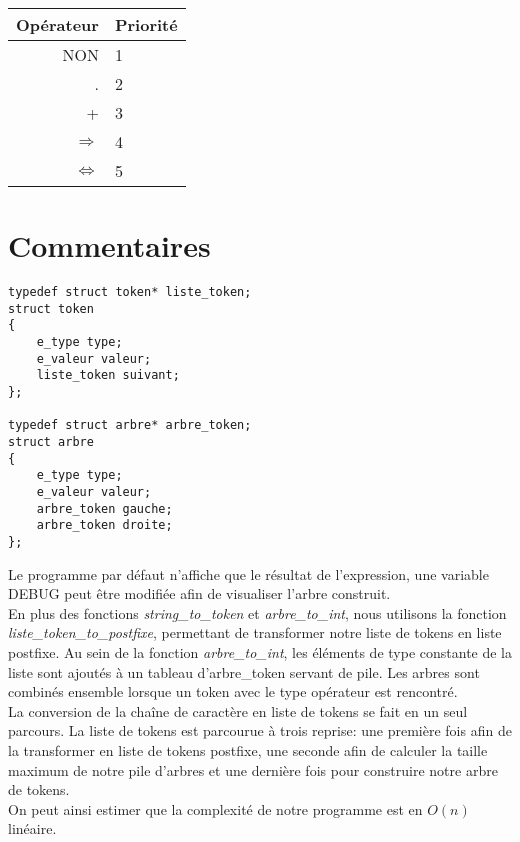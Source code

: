\documentclass{article}
\begin{document}
\begin{tabular}[h]{|r|l|}
\hline 
    Opérateur & Priorité\\ 
\hline 
    NON & 1\\
\hline 
    . & 2\\
\hline 
    + & 3\\
\hline 
    $\Rightarrow$ & 4\\
\hline 
    $\Leftrightarrow$ & 5\\
\hline
\end{tabular}
\section{Commentaires}
\begin{verbatim}
typedef struct token* liste_token;
struct token
{
	e_type type;
	e_valeur valeur;
	liste_token suivant;
};

typedef struct arbre* arbre_token;
struct arbre
{
	e_type type;
	e_valeur valeur;
	arbre_token gauche;
	arbre_token droite;
};
\end{verbatim}
Le programme par défaut n'affiche que le résultat de l'expression, une variable DEBUG peut être modifiée afin de visualiser l'arbre construit.\\
En plus des fonctions \textit{string\_to\_token} et \textit{arbre\_to\_int}, nous utilisons la fonction \textit{liste\_token\_to\_postfixe}, permettant de transformer notre liste de tokens en liste postfixe.
Au sein de la fonction \textit{arbre\_to\_int}, les éléments de type constante de la liste sont ajoutés à un tableau d'arbre\_token servant de pile. Les arbres sont combinés ensemble lorsque un token avec le type opérateur est rencontré. 
\\
La conversion de la chaîne de caractère en liste de tokens se fait en un seul parcours.
La liste de tokens est parcourue à trois reprise: une première fois afin de la transformer en liste de tokens postfixe, une seconde afin de calculer la taille maximum de notre pile d'arbres et une dernière fois pour construire notre arbre de tokens.\\
On peut ainsi estimer que la complexité de notre programme est en $O(n)$ linéaire.
\end{document}
